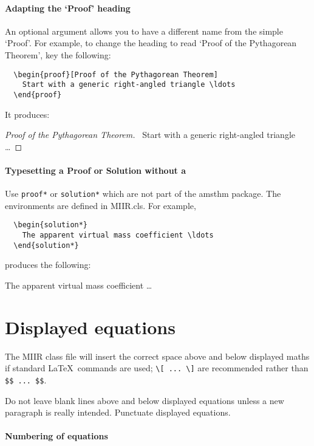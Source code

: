 \documentclass{MIIR}
\theoremstyle{plain}
\theoremstyle{definition}
\begin{document}
\paragraph{Adapting the `Proof' heading}
An optional argument allows you to have a different
name from the simple `Proof'. For example, to change the heading
to read `Proof of the Pythagorean Theorem', key the following:

\begin{verbatim}
  \begin{proof}[Proof of the Pythagorean Theorem]
    Start with a generic right-angled triangle \ldots
  \end{proof}
\end{verbatim}

It produces:
  \begin{proof}[Proof of the Pythagorean Theorem]\ 
    Start with a generic right-angled triangle \ldots
  \end{proof}

\paragraph{Typesetting a Proof or Solution without a \qedsymbol}
Use \verb"proof*" or \verb"solution*" which are not part of the amsthm package. The environments are defined in MIIR.cls.
For example,
\begin{verbatim}
  \begin{solution*}
    The apparent virtual mass coefficient \ldots
  \end{solution*}
\end{verbatim}
produces the following:
  \begin{solution*}
    The apparent virtual mass coefficient \ldots
  \end{solution*}

\section{Displayed equations}

The MIIR class file will insert the correct space above and below
displayed maths if standard \LaTeX\ commands are used; 
\verb"\[ ... \]" are recommended rather than \verb"$$ ... $$". 

Do not leave blank
lines above and below displayed equations unless a new paragraph is
really intended. Punctuate displayed equations.

\paragraph{Numbering of equations}
\end{document}
